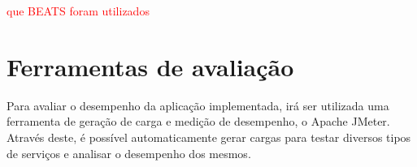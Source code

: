 \documentclass[12pt,a4paper]{article}
\begin{document}
\textcolor{red}{que BEATS foram utilizados}




\newpage
\section{Ferramentas de avaliação}

Para avaliar o desempenho da aplicação implementada, irá ser utilizada uma ferramenta de geração de carga e medição de desempenho, o Apache JMeter. Através deste, é possível automaticamente gerar cargas para testar diversos tipos de serviços e analisar o desempenho dos mesmos.

\end{document}
